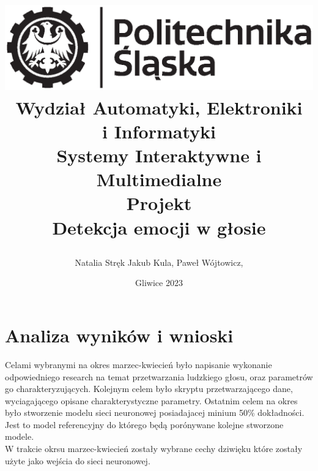 \documentclass[12pt,titlepage]{article}
\title{
\includegraphics[scale=0.75]{img/politechnika_sl_logo_bw_poziom_pl.eps}\\
\textbf{Wydział Automatyki, Elektroniki\\
i Informatyki}\\
\vspace*{1cm}
Systemy Interaktywne i Multimedialne \\ Projekt \\ Detekcja emocji w głosie

\vspace*{5cm}
}
\author{
Natalia Stręk
Jakub Kula,
Paweł Wójtowicz,
}
\date{Gliwice 2023}
\begin{document}
\maketitle


\newpage
\section{Analiza wyników i wnioski}
Celami wybranymi na okres marzec-kwiecień było napisanie wykonanie odpowiedniego research na temat przetwarzania ludzkiego głosu, oraz parametrów go charakteryzujących. Kolejnym celem było skryptu przetwarzającego dane, wyciagającego opisane charakterystyczne parametry. Ostatnim celem na okres było stworzenie modelu sieci neuronowej posiadajacej minium 50\% dokładności. Jest to model referencyjny do którego będą porónywane kolejne stworzone modele.\\


W trakcie okrsu marzec-kwiecień zostały wybrane cechy dziwięku które zostały użyte jako wejścia do sieci neuronowej.
\end{document}

